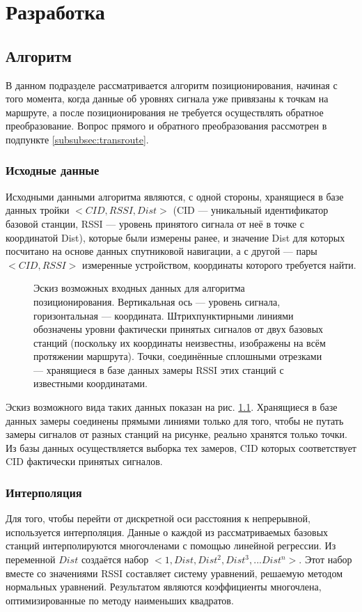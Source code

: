 \chapter{Разработка}

\section{Алгоритм}
В данном подразделе рассматривается алгоритм позиционирования, начиная с того момента, когда данные об уровнях сигнала уже привязаны к точкам на маршруте, а после позиционирования не требуется осуществлять обратное преобразование. Вопрос прямого и обратного преобразования рассмотрен в подпункте \ref{subsubsec:transroute}.

\subsection{Исходные данные}
Исходными данными алгоритма являются, с одной стороны, хранящиеся в базе данных тройки $<CID, RSSI, Dist>$ (CID --- уникальный идентификатор базовой станции, RSSI --- уровень принятого сигнала от неё в точке с координатой Dist), которые были измерены ранее, и значение Dist для которых посчитано на основе данных спутниковой навигации, а с другой --- пары $<CID, RSSI>$ измеренные устройством, координаты которого требуется найти.

\begin{figure}[h]
	\caption{Эскиз возможных входных данных для алгоритма позиционирования. Вертикальная ось --- уровень сигнала, горизонтальная --- координата. Штрихпунктирными линиями обозначены уровни фактически принятых сигналов от двух базовых станций (поскольку их координаты неизвестны, изображены на всём протяжении маршрута). Точки, соединённые сплошными отрезками --- хранящиеся в базе данных замеры RSSI этих станций с известными координатами.}
	\label{fig:madmax-input}
\end{figure}

Эскиз возможного вида таких данных показан на рис. \ref{fig:madmax-input}. Хранящиеся в базе данных замеры соединены прямыми линиями только для того, чтобы не путать замеры сигналов от разных станций на рисунке, реально хранятся только точки. Из базы данных осуществляется выборка тех замеров, CID которых соответствует CID фактически принятых сигналов.

\subsection{Интерполяция}
Для того, чтобы перейти от дискретной оси расстояния к непрерывной, используется интерполяция. Данные о каждой из рассматриваемых базовых станций интерполируются многочленами с помощью линейной регрессии. Из переменной $Dist$ создаётся набор $<1, Dist, Dist^2, Dist^3, ... Dist^n>$. Этот набор вместе со значениями RSSI составляет систему уравнений, решаемую методом нормальных уравнений. Результатом являются коэффициенты многочлена, оптимизированные по методу наименьших квадратов.


